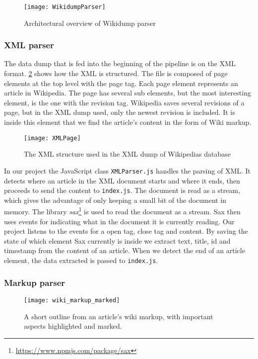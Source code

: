 \begin{figure}[h]
\caption{Architectural overview of Wikidump parser}
\texttt{[image: WikidumpParser]}
\label{fig:wikidump_parser}
\end{figure}

\subsubsection{XML parser}

The data dump that is fed into the beginning of the pipeline is on the XML format. \ref{fig:xml} shows how the XML is structured. The file is composed of page elements at the top level with the page tag. Each page element represents an article in Wikipedia. The page has several sub elements, but the most interesting element, is the one with the revision tag. Wikipedia saves several revisions of a page, but in the XML dump used, only the newest revision is included. It is inside this element that we find the article's content in the form of Wiki markup.

\begin{figure}[h]
\caption{The XML structure used in the XML dump of Wikipedias database}
\texttt{[image: XMLPage]}
\label{fig:xml}
\end{figure}

In our project the JavaScript class \texttt{XMLParser.js} handles the parsing of XML. It detects where an article in the XML document starts and where it ends, then proceeds to send the content to \texttt{index.js}. The document is read as a stream, which gives the advantage of only keeping a small bit of the document in memory. The library \textit{sax}\footnote{\url{https://www.npmjs.com/package/sax}} is used to read the document as a stream. Sax then uses events for indicating what in the document it is currently reading. Our project listens to the events for a open tag, close tag and content. By saving the state of which element Sax currently is inside we extract text, title, id and timestamp from the content of an article. When we detect the end of an article element, the data extracted is passed to \texttt{index.js}.

\subsubsection{Markup parser}

\begin{figure}[h]
\caption{A short outline from an article's wiki markup, with important aspects highlighted and marked. }
\texttt{[image: wiki\_markup\_marked]}
\label{fig:wiki_markup}
\end{figure}


